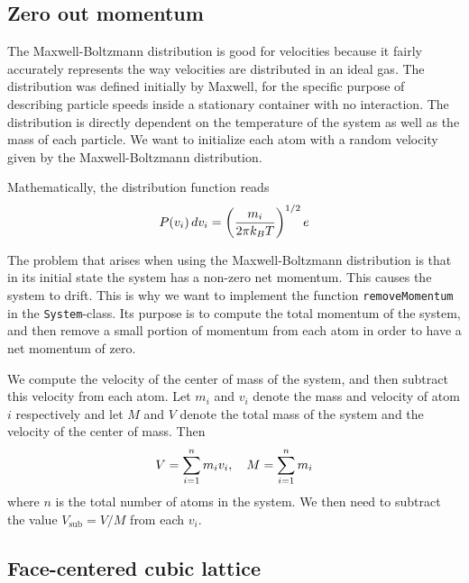 \documentclass[a4paper]{article}
\begin{document}
\subsection{Zero out momentum}
\label{sub:zero_out_momentum}

    The Maxwell-Boltzmann distribution is good for velocities because it fairly
    accurately represents the way velocities are distributed in an ideal gas.
    The distribution was defined initially by Maxwell, for the specific purpose
    of describing particle speeds inside a stationary container with no
    interaction.  The distribution is directly dependent on the temperature of
    the system as well as the mass of each particle. We want to initialize each
    atom with a random velocity given by the Maxwell-Boltzmann distribution.

    Mathematically, the distribution function reads
    \begin{equation}
        \notag
        P(v_i)\, dv_i = \left( \frac{m_i}{2\pi k_BT} \right)^{1/2} e
    \end{equation}
    
    The problem that arises when using the Maxwell-Boltzmann distribution is
    that in its initial state the system has a non-zero net momentum. This
    causes the system to drift. This is why we want to implement the function
    \texttt{removeMomentum} in the \texttt{System}-class. Its purpose is to
    compute the total momentum of the system, and then remove a small portion
    of momentum from each atom in order to have a net momentum of zero. 
    
    We compute the velocity of the center of mass of the system, and then
    subtract this velocity from each atom.  Let $m_i$ and $v_i$ denote the mass
    and velocity of atom $i$ respectively and let $M$ and $V$ denote the total
    mass of the system and the velocity of the center of mass. Then
    \begin{align*}
        \notag
        V = \sum^{n}_{i=1} m_i v_i, \quad M = \sum^{n}_{i=1} m_i
    \end{align*}
    where $n$ is the total number of atoms in the system. We then need to
    subtract the value $V_{\mathrm{sub}} = V / M$ from each $v_i$.

\subsection{Face-centered cubic lattice}
\label{sub:face_centered_cubic_lattice}
\end{document}
